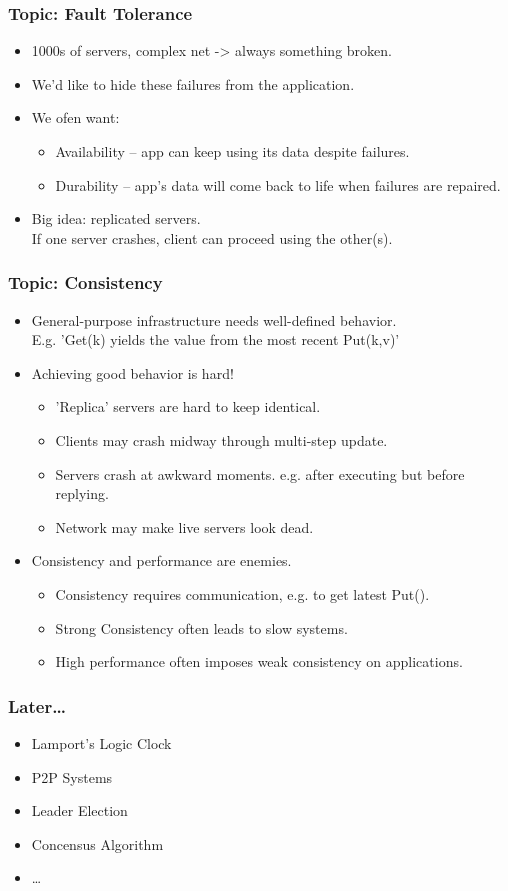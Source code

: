 \begin{frame}
    \frametitle{Topic: Fault Tolerance}
    \begin{itemize}
        \item 1000s of servers, complex net -> always something broken.
        \item We'd like to hide these failures from the application.
        \item We ofen want:
        \begin{itemize}
            \item Availability  -- app can keep using its data despite failures. \\
            \item Durability -- app's data will come back to life when failures are repaired. \\
        \end{itemize}
        \item Big idea: replicated servers. \\
        If one server crashes, client can proceed using the other(s).
    \end{itemize}
\end{frame}

\begin{frame}
    \frametitle{Topic: Consistency}
    \begin{itemize}
        \item General-purpose infrastructure needs well-defined behavior. \\
            E.g. 'Get(k) yields the value from the most recent Put(k,v)'
        \item Achieving good behavior is hard!
        \begin{itemize}
            \item 'Replica' servers are hard to keep identical.
            \item Clients may crash midway through multi-step update.
            \item Servers crash at awkward moments. e.g. after executing but before replying.
            \item Network may make live servers look dead.
        \end{itemize}
        \item Consistency and performance are enemies.
        \begin{itemize}
            \item Consistency requires communication, e.g. to get latest Put().
            \item \alert{Strong Consistency} often leads to slow systems.
            \item High performance often imposes \alert{weak consistency} on applications.
        \end{itemize}
    \end{itemize}
\end{frame}

\begin{frame}
    \frametitle{Later\ldots}
    \begin{itemize}
        \item Lamport's Logic Clock
        \item P2P Systems
        \item Leader Election
        \item Concensus Algorithm
        \item \ldots
    \end{itemize}
\end{frame}
